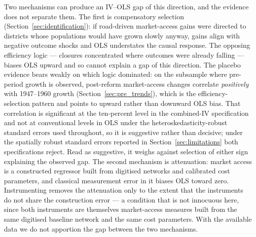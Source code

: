 Two mechanisms can produce an IV--OLS gap of this direction, and the
evidence does not separate them. The first is compensatory selection
(Section~\ref{sec:identification}): if road-driven market-access
gains were directed to districts whose populations would have grown
slowly anyway, gains align with negative outcome shocks and OLS
understates the causal response. The opposing efficiency logic ---
closures concentrated where outcomes were already falling --- biases
OLS upward and so cannot explain a gap of this direction. The placebo
evidence bears weakly on which logic dominated: on the subsample where
pre-period growth is observed, post-reform market-access changes
correlate \emph{positively} with 1947--1960 growth
(Section~\ref{sec:pre_trends}), which is the efficiency-selection
pattern and points to upward rather than downward OLS bias. That
correlation is significant at the ten-percent level in the
combined-IV specification and not at conventional levels in OLS under
the heteroskedasticity-robust standard errors used throughout, so it
is suggestive rather than decisive; under the spatially robust
standard errors reported in Section~\ref{sec:limitations} both
specifications reject. Read as suggestive, it weighs
against selection of either sign explaining the observed gap.
The second mechanism is attenuation: market
access is a constructed regressor built from digitised networks and
calibrated cost parameters, and classical measurement error in it
biases OLS toward zero. Instrumenting removes the attenuation only to
the extent that the instruments do not share the construction error
--- a condition that is not innocuous here, since both instruments
are themselves market-access measures built from the same digitised
baseline network and the same cost parameters. With the available
data we do not apportion the gap between the two mechanisms.



